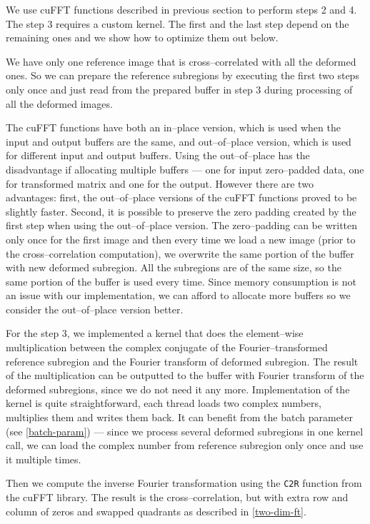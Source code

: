 We use cuFFT functions described in previous section to perform steps 2 and 4. The step 3 requires a custom kernel. The first and the last step depend on the remaining ones and we show how to optimize them out below.

We have only one reference image that is cross--correlated with all the deformed ones. So we can prepare the reference subregions by executing the first two steps only once and just read from the prepared buffer in step 3 during processing of all the deformed images. 

The cuFFT functions have both an in--place version, which is used when the input and output buffers are the same, and out--of--place version, which is used for different input and output buffers. Using the out--of--place has the disadvantage if allocating multiple buffers --- one for input zero--padded data, one for transformed matrix and one for the output. However there are two advantages: first, the out--of--place versions of the cuFFT functions proved to be slightly faster. Second, it is possible to preserve the zero padding created by the first step when using the out--of--place version. The zero--padding can be written only once for the first image and then every time we load a new image (prior to the cross--correlation computation), we overwrite the same portion of the buffer with new deformed subregion. All the subregions are of the same size, so the same portion of the buffer is used every time. Since memory consumption is not an issue with our implementation, we can afford to allocate more buffers so we consider the out--of--place version better.

For the step 3, we implemented a kernel that does the element--wise multiplication between the complex conjugate of the Fourier--transformed reference subregion and the Fourier transform of deformed subregion. The result of the multiplication can be outputted to the buffer with Fourier transform of the deformed subregions, since we do not need it any more. Implementation of the kernel is quite straightforward, each thread loads two complex numbers, multiplies them and writes them back. It can benefit from the batch parameter (see \cref{batch-param}) --- since we process several deformed subregions in one kernel call, we can load the complex number from reference subregion only once and use it multiple times.



Then we compute the inverse Fourier transformation using the \texttt{C2R} function from the cuFFT library. The result is the cross--correlation, but with extra row and column of zeros and swapped quadrants as described in \cref{two-dim-ft}.

